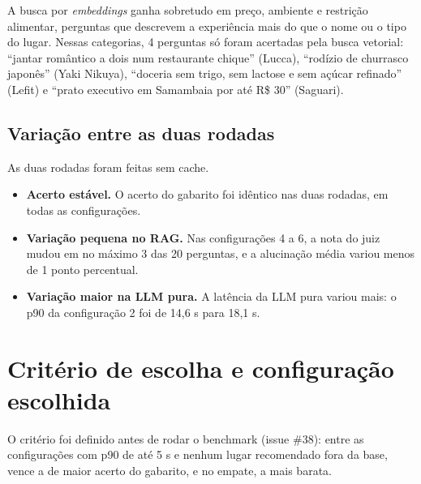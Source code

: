 \documentclass[11pt,a4paper]{article}
\begin{document}
A busca por \textit{embeddings} ganha sobretudo em preço, ambiente e restrição alimentar, perguntas que descrevem a experiência mais do que o nome ou o tipo do lugar. Nessas categorias, 4 perguntas só foram acertadas pela busca vetorial: ``jantar romântico a dois num restaurante chique'' (Lucca), ``rodízio de churrasco japonês'' (Yaki Nikuya), ``doceria sem trigo, sem lactose e sem açúcar refinado'' (Lefit) e ``prato executivo em Samambaia por até R\$ 30'' (Saguari).

\subsection{Variação entre as duas rodadas}

As duas rodadas foram feitas sem cache.

\begin{itemize}
\item \textbf{Acerto estável.} O acerto do gabarito foi idêntico nas duas rodadas, em todas as configurações.
\item \textbf{Variação pequena no RAG.} Nas configurações 4 a 6, a nota do juiz mudou em no máximo 3 das 20 perguntas, e a alucinação média variou menos de 1 ponto percentual.
\item \textbf{Variação maior na LLM pura.} A latência da LLM pura variou mais: o p90 da configuração 2 foi de 14,6 s para 18,1 s.
\end{itemize}

\section{Critério de escolha e configuração escolhida}

O critério foi definido antes de rodar o benchmark (issue \#38): entre as configurações com p90 de até 5 s e nenhum lugar recomendado fora da base, vence a de maior acerto do gabarito, e no empate, a mais barata.
\end{document}
